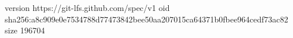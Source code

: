 version https://git-lfs.github.com/spec/v1
oid sha256:a8c909e0e7534788d77473842bee50aa207015ca64371b0fbee964cedf73ac82
size 196704
